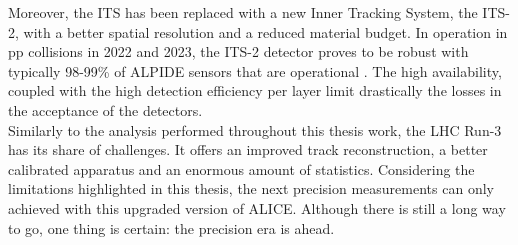 Moreover, the ITS has been replaced with a new Inner Tracking System, the ITS-2, with a better spatial resolution and a reduced material budget. In operation in pp collisions in 2022 and 2023, the ITS-2 detector proves to be robust with typically 98-99\% of ALPIDE sensors that are operational \cite{alicecollaborationALICEUpgradesLHC2023}. The high availability, coupled with the high detection efficiency per layer limit drastically the losses in the acceptance of the detectors.\\

Similarly to the analysis performed throughout this thesis work, the LHC Run-3 has its share of challenges. It offers an improved track reconstruction, a better calibrated apparatus and an enormous amount of statistics. Considering the limitations highlighted in this thesis, the next precision measurements can only achieved with this upgraded version of ALICE. Although there is still a long way to go, one thing is certain: the precision era is ahead.

%

\newpage
    

